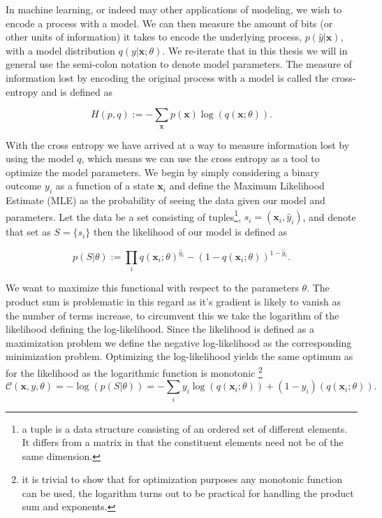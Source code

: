 In machine learning, or indeed may other applications of modeling, we wish to encode a process with a model. We can then measure the amount of bits (or other units of information) it takes to encode the underlying process, $p(\hat{y} | \mathbf{x})$, with a model distribution $q(y| \mathbf{x}; \theta)$. We re-iterate that in this thesis we will in general use the semi-colon notation to denote model parameters. The measure of information lost by encoding the original process with a model is called the cross-entropy and is defined as

\begin{equation}
H(p, q) := - \sum_\mathbf{x} p(\mathbf{x})\log(q(\mathbf{x}; \theta)).
\end{equation}

\noindent With the cross entropy we have arrived at a way to measure information lost by using the model $q$, which means we can use the cross entropy as a tool to optimize the model parameters. We begin by simply considering a binary outcome $y_i$ as a function of a state $\mathbf{x}_i$ and define the Maximum Likelihood Estimate (MLE) as the probability of seeing the data given our model and parameters. Let the data be a set consisting of tuples\footnote{a tuple is a data structure consisting of an ordered set of different elements. It differs from a matrix in that the constituent elements need not be of the same dimension.}, $s_i = (\mathbf{x}_i, \hat{y}_i)$, and denote that set as $S = \{s_i\}$ then the likelihood of our model is defined as 

\begin{equation}\label{eq:likelihood}
p(S | \theta) := \prod_i q(\mathbf{x}_i; \theta)^{\hat{y}_i} - (1-q(\mathbf{x}_i; \theta))^{1-\hat{y}_i}.
\end{equation}

\noindent We want to maximize this functional with respect to the parameters $\theta$. The product sum is problematic in this regard as it's gradient is likely to vanish as the number of terms increase, to circumvent this we take the logarithm of the likelihood defining the log-likelihood. Since the likelihood is defined as a maximization problem we define the negative log-likelihood as the corresponding minimization problem. Optimizing the log-likelihood yields the same optimum as for the likelihood as the logarithmic function is monotonic \footnote{it is trivial to show that for optimization purposes any monotonic function can be used, the logarithm turns out to be practical for handling the product sum and exponents.}
\begin{equation}\label{eq:mle}
\mathcal{C}(\mathbf{x}, y, \theta) = -\log(p(S | \theta)) = -\sum_i y_i\log(q(\mathbf{x}_i; \theta)) + (1-y_i)(q(\mathbf{x}_i; \theta)).
\end{equation}

